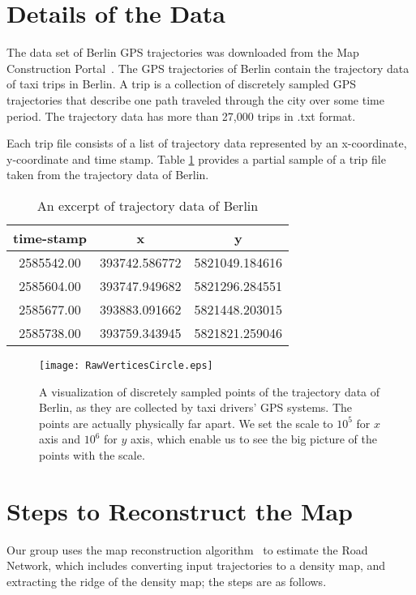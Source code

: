 \documentclass[11pt]{article}
\begin{document}
\section*{Details of the Data}
\par
The data set of Berlin GPS trajectories was downloaded from the Map Construction Portal~\cite{link}. The GPS trajectories of Berlin contain the trajectory data of taxi trips in Berlin. A trip is a collection of discretely sampled GPS trajectories that describe one path traveled through the city over some time period. The trajectory data has more than 27,000 trips in .txt format. 
\par
Each trip file consists of a list of trajectory data represented by an x-coordinate, y-coordinate and time stamp. Table \ref{table:questions} provides a partial sample of a trip file taken from the trajectory data of Berlin.
\begin{table}[h!]
\begin{center}
\begin{tabular}{ |c |c| c| }
\hline
  time-stamp & x & y    \\ \hline
  2585542.00 & 393742.586772 & 5821049.184616    \\ \hline
  2585604.00 & 393747.949682 & 5821296.284551  \\  \hline
  2585677.00 & 393883.091662 & 5821448.203015  \\ \hline
  2585738.00 & 393759.343945 & 5821821.259046  \\ \hline
\end{tabular}
\end{center}
\caption{An excerpt of trajectory data of Berlin}
\label{table:questions}
\end{table}





\begin{figure}[H]
  \caption{A visualization of discretely sampled points of the trajectory data of Berlin, as they are collected by taxi drivers' GPS systems. The points are actually physically far apart. We set the scale to $10^5$ for $x$ axis and $10^6$ for $y$ axis, which enable us to see the big picture of the points with the scale.}
  \centering
 \texttt{[image: RawVerticesCircle.eps]} 
\end{figure}

\section*{Steps to Reconstruct the Map}
\par
Our group uses the map reconstruction algorithm~\cite{Wang15} to estimate the Road Network, which includes converting input trajectories to a density map, and  extracting the ridge of the 
density map; the  steps are as follows.   
\end{document}
